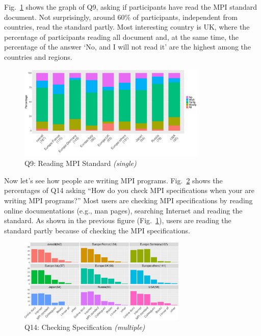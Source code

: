 \documentclass[conference,10pt,letterpaper]{IEEEtran}
\def\myquote#1{`#1'}
\begin{document}
Fig.~\ref{fig:reading-standard} shows the graph of Q9, asking if
participants have read the MPI standard document. Not surprisingly,
around 60\% of participants, independent from countries, read the
standard partly. Most interesting country is UK, where the percentage
of participants reading all document and, at the same time, the
percentage of the answer \myquote{No, and I will not read it} are the
highest among the countries and regions. 

\begin{figure}[htb]
\begin{center}
\includegraphics[width=9cm]{R-scripts/Q9.pdf}
\caption{Q9: Reading MPI Standard {\it(single)}}
\label{fig:reading-standard}
\end{center}
\end{figure}

Now let's see how people are writing MPI
programs. Fig.~\ref{fig:checking-spec} shows the percentages of Q14
asking ``How do you check MPI specifications when your are writing MPI
programs?'' Most users are checking MPI specifications by reading online
documentations (e.g., man pages), searching Internet and reading the
standard. As shown in the previous figure
(Fig.~\ref{fig:reading-standard}), users are reading the standard
partly because of checking the MPI specifications.

\begin{figure}[htb]
\begin{center}
\includegraphics[width=8cm]{R-scripts/Q14.pdf}
\caption{Q14: Checking Specification {\it(multiple)}}
\label{fig:checking-spec}
\end{center}
\end{figure}
\end{document}
